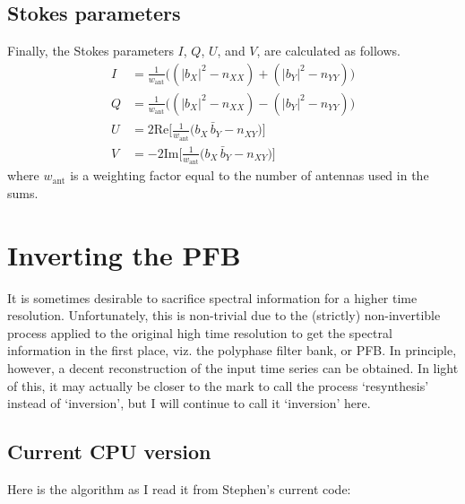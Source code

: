 \documentclass{article}
\begin{document}
\subsection{Stokes parameters}

Finally, the Stokes parameters $I$, $Q$, $U$, and $V$, are calculated as follows.
\begin{align}
    I &= \frac{1}{w_\text{ant}}\bigg((|b_X|^2 - n_{XX}) + (|b_Y|^2 - n_{YY})\bigg) \\
    Q &= \frac{1}{w_\text{ant}}\bigg((|b_X|^2 - n_{XX}) - (|b_Y|^2 - n_{YY})\bigg) \\
    U &=  2 \text{Re}\bigg[\frac{1}{w_\text{ant}}\bigg(b_X\,\bar{b}_Y - n_{XY}\bigg)\bigg]\\
    V &= -2 \text{Im}\bigg[\frac{1}{w_\text{ant}}\bigg(b_X\,\bar{b}_Y - n_{XY}\bigg)\bigg]
\end{align}
where $w_\text{ant}$ is a weighting factor equal to the number of antennas used in the sums.

\newpage
\section{Inverting the PFB}

It is sometimes desirable to sacrifice spectral information for a higher time resolution.
Unfortunately, this is non-trivial due to the (strictly) non-invertible process applied to the original high time resolution to get the spectral information in the first place, viz. the polyphase filter bank, or PFB.
In principle, however, a decent reconstruction of the input time series can be obtained.
In light of this, it may actually be closer to the mark to call the process `resynthesis' instead of `inversion', but I will continue to call it `inversion' here.

\subsection{Current CPU version}

Here is the algorithm as I read it from Stephen's current code:

\newcommand{\blue}[1]{{\color{blue}#1}}
\newcommand{\red}[1]{{\color{red}#1}}
\newcommand{\arrsize}[1]{{\color{red}[}#1{\color{red}]}}
\newcommand{\vrbl}[1]{{\texttt{\blue{#1}}}}
\end{document}
